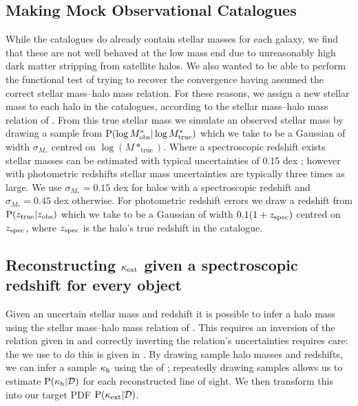 \documentclass[useAMS,usenatbib]{mn2e}
\begin{document}
\subsection{Making Mock Observational Catalogues}

While the \MS catalogues do already contain stellar masses for each galaxy, we
find that these are not well behaved at the low mass end due to unreasonably high dark matter stripping from satellite halos. We also wanted to be able to perform the functional test of
trying to recover the convergence having assumed the correct stellar
mass--halo mass relation. For these reasons, we assign a new stellar mass to
each halo in the \MS catalogues, according to the stellar mass--halo mass
relation of \citet{BehrooziEtal2010}. From this true  stellar mass we
simulate an observed stellar mass by drawing a sample from 
${\rm P}(\log{M^{*}_{\rm obs}}|\log{M^{*}_{\rm true}})$ which we take to be a
Gaussian of width $\sigma_{M_*}$ centred on $\log(M*_{\mathrm {true}})$. Where
a spectroscopic redshift exists stellar masses can be estimated with typical
uncertainties of 0.15 dex \citep{AugerEtal2009}; however with photometric
redshifts stellar mass uncertainties are typically three times as large. We
use $\sigma_{M_*}=0.15$ dex for halos with a spectroscopic redshift and
$\sigma_{M_*}=0.45$ dex otherwise. For photometric redshift errors we draw a
redshift from ${\rm P}(z_{\rm true}|z_{\rm obs})$ which we take to be a Gaussian
of width $0.1(1+z_{\rm spec})$ centred on $z_{\rm spec}$, where $z_{\rm spec}$
is the halo's true redshift in the \MS catalogue.


\subsection{Reconstructing $\kappa_{\rm ext}$ given a spectroscopic redshift for every object}

Given an uncertain stellar mass and redshift it is possible to infer a
halo mass using the stellar mass--halo mass relation of
\citet{BehrooziEtal2010}. This \proceedure requires an inversion of the
relation given in \citet{BehrooziEtal2010} and correctly inverting the
relation's uncertainties requires care: the \proceedure we use to do this
is given in . By drawing sample halo masses
and redshifts, we can infer a sample $\kappa_{\rm h}$ using the \proceedure of
; repeatedly drawing samples allows us to
estimate ${\rm P}(\kappa_{\rm h}|{\mathcal{D}})$ for each reconstructed line of sight. We then
transform this into our target PDF ${\rm P}(\kappa_{\rm ext}|{\mathcal{D}})$.
\end{document}
